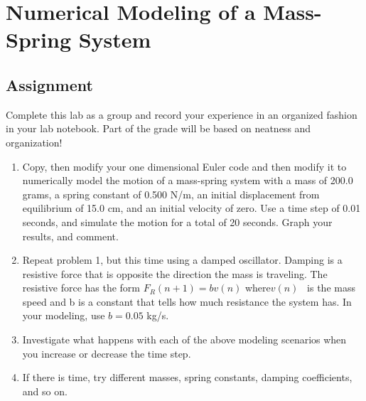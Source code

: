 \documentclass[twoside,11pt,ShortChapTitles]{BYUTextbook}
\begin{document}
\chapter[Numerical Modeling II]{Numerical Modeling of a Mass-Spring System}
\section{Assignment}

{\small Complete this lab as a group and record your experience in an
organized fashion in your lab notebook. Part of the grade will be based on
neatness and organization!}

\begin{enumerate}
\item Copy, then modify your one dimensional Euler code and then
modify it to numerically model the motion of a mass-spring system with a
mass of 200.0 grams, a spring constant of 0.500 N/m, an initial displacement
from equilibrium of 15.0 cm, and an initial velocity of zero. Use a time
step of 0.01 seconds, and simulate the motion for a total of 20 seconds.
Graph your results, and comment.

\item  Repeat problem 1, but this time using a damped oscillator.
Damping is a resistive force that is opposite the direction the mass is
traveling. The resistive force has the form $F_{R}\left( n+1\right)
=bv\left( n\right) $ where$v\left( n\right) $ \ is the
mass speed and b is a constant that tells how much resistance the system has. In your modeling, use $b=0.05$  kg/s.

\item  Investigate what happens with each of the above modeling
scenarios when you increase or decrease the time step.

\item If there is time, try different masses, spring constants,
damping coefficients, and so on.

\end{enumerate}
\end{document}
